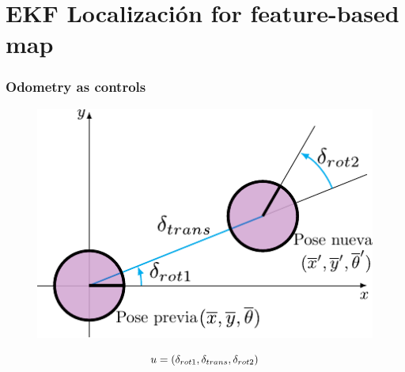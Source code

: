 \section{EKF Localización for feature-based map}

\begin{frame}
    \frametitle{Odometry as controls}
    
       \begin{figure}[!h]
        \includegraphics[width=0.6\columnwidth]{./images/odometry_as_controls.pdf}
    \end{figure}

    \begin{equation*}
        u = (\delta_{rot1}, \delta_{trans}, \delta_{rot2})
    \end{equation*}
    
\end{frame}

